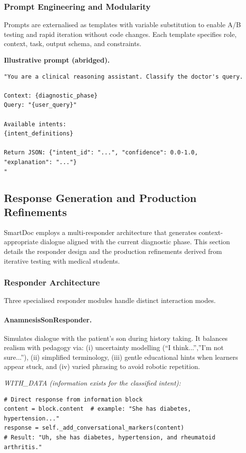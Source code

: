 \subsubsection{Prompt Engineering and Modularity}

Prompts are externalised as templates with variable substitution to enable A/B
testing and rapid iteration without code changes. Each template specifies role,
context, task, output schema, and constraints.

\noindent\textbf{Illustrative prompt (abridged).}
\begin{verbatim}
"You are a clinical reasoning assistant. Classify the doctor's query.

Context: {diagnostic_phase}
Query: "{user_query}"

Available intents:
{intent_definitions}

Return JSON: {"intent_id": "...", "confidence": 0.0-1.0, "explanation": "..."}
"
\end{verbatim}

\subsection{Response Generation and Production Refinements}
\label{sec:response_generation}

SmartDoc employs a multi-responder architecture that generates context-appropriate
dialogue aligned with the current diagnostic phase. This section details the
responder design and the production refinements derived from iterative testing
with medical students.

\subsubsection{Responder Architecture}

Three specialised responder modules handle distinct interaction modes.

\paragraph{AnamnesisSonResponder.}
Simulates dialogue with the patient's son during history taking.
It balances realism with pedagogy via:
(i) uncertainty modelling (``I think...'',''I'm not sure...''),
(ii) simplified terminology,
(iii) gentle educational hints when learners appear stuck, and
(iv) varied phrasing to avoid robotic repetition.

\noindent\textit{WITH\_DATA (information exists for the classified intent):}
\begin{verbatim}
# Direct response from information block
content = block.content  # example: "She has diabetes, hypertension..."
response = self._add_conversational_markers(content)
# Result: "Uh, she has diabetes, hypertension, and rheumatoid arthritis."
\end{verbatim}

